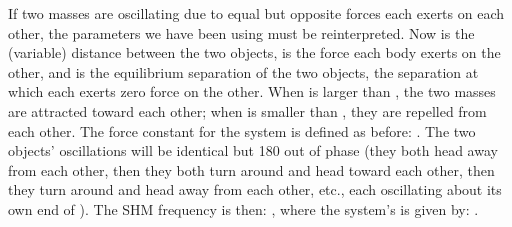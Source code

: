 {
If two masses are oscillating due to equal but opposite forces each exerts
on each other, the parameters we have been using must be reinterpreted.
Now  is the (variable) distance between the two objects,  is
the force each body exerts on the other, and  is the equilibrium
separation of the two objects, the separation at which each exerts zero
force on the other.
When  is larger than , the two masses are attracted toward each other;
when  is smaller than , they are repelled from each other.
The force constant for the system is defined as before: .
The two objects' oscillations will be identical but {180\degrees} out of
phase (they both head away from each other, then they both
turn around and head toward each other, then they turn around and head
away from each other, etc., each oscillating about its own end of ).
%
%
The SHM frequency is then: , where
the system's  \m{\mu} is given by:
.
%
}%
%
%
